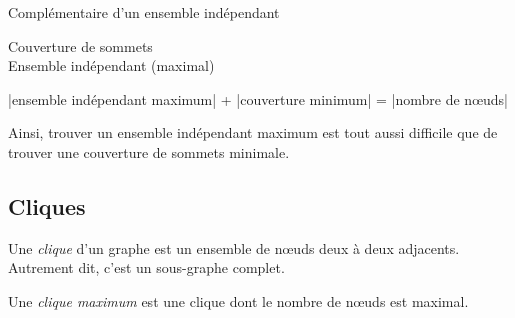 \begin{myexem} \label{cm7:ex1}
	Complémentaire d'un ensemble indépendant
	\begin{figure} [!h]
	\centering
	\end{figure} \newline
	\color{green}Couverture de sommets \\
	\color{red}Ensemble indépendant (maximal)
	\color{black}
\end{myexem}


\begin{mycorr}
|ensemble indépendant maximum| + |couverture minimum| = |nombre de nœuds|
\end{mycorr}

Ainsi, trouver un ensemble indépendant maximum est tout aussi difficile que de trouver une couverture de sommets minimale.

\subsection{Cliques}

\begin{mydef}
Une \emph{clique} d'un graphe est un ensemble de nœuds deux à deux adjacents. Autrement dit, c'est un sous-graphe complet.
\end{mydef}

\begin{mydef}
Une \emph{clique maximum} est une clique dont le nombre de nœuds est maximal.
\end{mydef}

